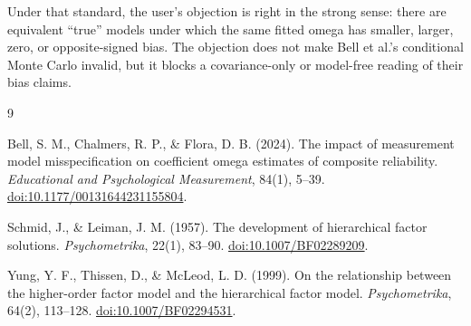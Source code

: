 \documentclass[11pt]{article}
\theoremstyle{plain}
\theoremstyle{remark}
\begin{document}
Under that standard, the user's objection is right in the strong sense: there
are equivalent ``true'' models under which the same fitted omega has smaller,
larger, zero, or opposite-signed bias. The objection does not make Bell et al.'s
conditional Monte Carlo invalid, but it blocks a covariance-only or
model-free reading of their bias claims.

\begin{thebibliography}{9}

Bell, S. M., Chalmers, R. P., \& Flora, D. B. (2024).
The impact of measurement model misspecification on coefficient omega estimates
of composite reliability.
\emph{Educational and Psychological Measurement}, 84(1), 5--39.
\href{https://doi.org/10.1177/00131644231155804}{doi:10.1177/00131644231155804}.

Schmid, J., \& Leiman, J. M. (1957).
The development of hierarchical factor solutions.
\emph{Psychometrika}, 22(1), 83--90.
\href{https://doi.org/10.1007/BF02289209}{doi:10.1007/BF02289209}.

Yung, Y. F., Thissen, D., \& McLeod, L. D. (1999).
On the relationship between the higher-order factor model and the hierarchical
factor model.
\emph{Psychometrika}, 64(2), 113--128.
\href{https://doi.org/10.1007/BF02294531}{doi:10.1007/BF02294531}.

\end{thebibliography}
\end{document}
